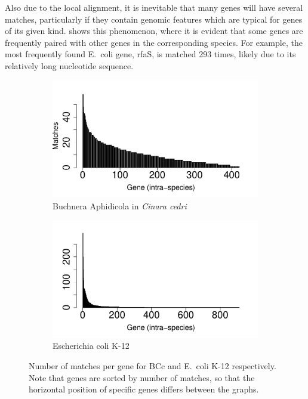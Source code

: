 \documentclass[10pt]{article}\usepackage[]{graphicx}\usepackage[]{color}
\makeatletter
\def\maxwidth{ %
  \ifdim\Gin@nat@width>\linewidth
    \linewidth
  \else
    \Gin@nat@width
  \fi
}
\newenvironment{knitrout}{}{} %
\theoremstyle{plain}
\theoremstyle{definition}
\makeatother
\begin{document}
\begin{multicols}{2}
Also due to the local alignment, it is inevitable that many genes will have several matches, particularly if they contain genomic features which are typical for genes of its given kind.  shows this phenomenon, where it is evident that some genes are frequently paired with other genes in the corresponding species. For example, the most frequently found E.\ coli gene, rfaS, is matched 293 times, likely due to its relatively long nucleotide sequence. 
\end{multicols}

\begin{figure}[H]
\begin{subfigure}{.49\linewidth}
\begin{knitrout}
\color{fgcolor}
\includegraphics[width=\maxwidth]{figure/unnamed-chunk-2-1} 

\end{knitrout}
\caption{Buchnera Aphidicola in \textit{Cinara cedri}}
\label{fig:matches_bcc}
\end{subfigure}
\begin{subfigure}{.49\linewidth}
\begin{knitrout}
\color{fgcolor}
\includegraphics[width=\maxwidth]{figure/unnamed-chunk-3-1} 

\end{knitrout}
\caption{Escherichia coli K-12}
\label{fig:matches_ecoli}
\end{subfigure}
\caption{Number of matches per gene for BCc and E.\ coli K-12 respectively. Note that genes are sorted by number of matches, so that the horizontal position of specific genes differs between the graphs.}
\label{fig:matches}
\end{figure}
\end{document}
